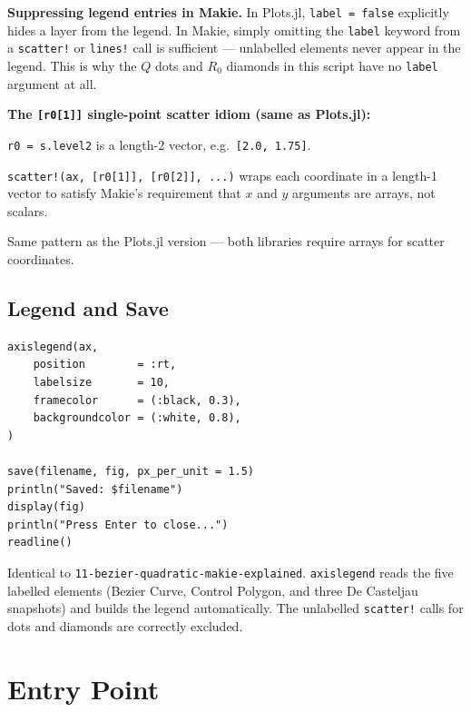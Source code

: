 \documentclass[12pt, a4paper]{article}
\newcommand{\cd}[1]{\texttt{#1}}
\begin{document}
\begin{notebox}
\textbf{Suppressing legend entries in Makie.}
In Plots.jl, \cd{label = false} explicitly hides a layer
from the legend.
In Makie, simply omitting the \cd{label} keyword from a
\cd{scatter!} or \cd{lines!} call is sufficient ---
unlabelled elements never appear in the legend.
This is why the $Q$ dots and $R_0$ diamonds in this
script have no \cd{label} argument at all.
\end{notebox}

\begin{examplebox}
\textbf{The \cd{[r0[1]]} single-point scatter idiom (same as Plots.jl):}

\cd{r0 = s.level2} is a length-2 vector, e.g.\ \cd{[2.0, 1.75]}.

\cd{scatter!(ax, [r0[1]], [r0[2]], ...)} wraps each coordinate
in a length-1 vector to satisfy Makie's requirement that
$x$ and $y$ arguments are arrays, not scalars.

Same pattern as the Plots.jl version --- both libraries
require arrays for scatter coordinates.
\end{examplebox}

\subsection{Legend and Save}

\begin{verbatim}
axislegend(ax,
    position        = :rt,
    labelsize       = 10,
    framecolor      = (:black, 0.3),
    backgroundcolor = (:white, 0.8),
)

save(filename, fig, px_per_unit = 1.5)
println("Saved: $filename")
display(fig)
println("Press Enter to close...")
readline()
\end{verbatim}

Identical to \cd{11-bezier-quadratic-makie-explained}.
\cd{axislegend} reads the five labelled elements
(Bezier Curve, Control Polygon, and three De Casteljau
snapshots) and builds the legend automatically.
The unlabelled \cd{scatter!} calls for dots and diamonds
are correctly excluded.


\section{Entry Point}
\end{document}
